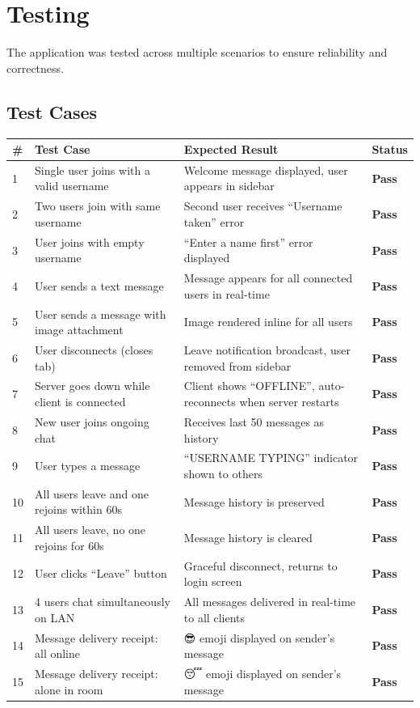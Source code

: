 \documentclass[12pt, a4paper]{article}
\begin{document}
\section{Testing}

The application was tested across multiple scenarios to ensure reliability and correctness.

\subsection{Test Cases}

\begin{longtable}{p{0.5cm} p{5cm} p{4cm} p{3cm}}
    \toprule
    \textbf{\#} & \textbf{Test Case} & \textbf{Expected Result} & \textbf{Status} \\
    \midrule
    \endhead
    1 & Single user joins with a valid username & Welcome message displayed, user appears in sidebar & \textbf{Pass} \\
    \midrule
    2 & Two users join with same username & Second user receives ``Username taken'' error & \textbf{Pass} \\
    \midrule
    3 & User joins with empty username & ``Enter a name first'' error displayed & \textbf{Pass} \\
    \midrule
    4 & User sends a text message & Message appears for all connected users in real-time & \textbf{Pass} \\
    \midrule
    5 & User sends a message with image attachment & Image rendered inline for all users & \textbf{Pass} \\
    \midrule
    6 & User disconnects (closes tab) & Leave notification broadcast, user removed from sidebar & \textbf{Pass} \\
    \midrule
    7 & Server goes down while client is connected & Client shows ``OFFLINE'', auto-reconnects when server restarts & \textbf{Pass} \\
    \midrule
    8 & New user joins ongoing chat & Receives last 50 messages as history & \textbf{Pass} \\
    \midrule
    9 & User types a message & ``USERNAME TYPING'' indicator shown to others & \textbf{Pass} \\
    \midrule
    10 & All users leave and one rejoins within 60s & Message history is preserved & \textbf{Pass} \\
    \midrule
    11 & All users leave, no one rejoins for 60s & Message history is cleared & \textbf{Pass} \\
    \midrule
    12 & User clicks ``Leave'' button & Graceful disconnect, returns to login screen & \textbf{Pass} \\
    \midrule
    13 & 4 users chat simultaneously on LAN & All messages delivered in real-time to all clients & \textbf{Pass} \\
    \midrule
    14 & Message delivery receipt: all online & 😎 emoji displayed on sender's message & \textbf{Pass} \\
    \midrule
    15 & Message delivery receipt: alone in room & 😴 emoji displayed on sender's message & \textbf{Pass} \\
    \bottomrule
\end{longtable}
\end{document}
